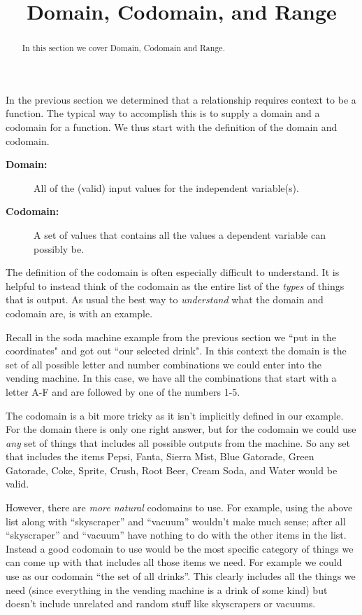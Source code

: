 \documentclass{ximera}
\title{Domain, Codomain, and Range}
\begin{document}
\begin{abstract}
    In this section we cover Domain, Codomain and Range.
\end{abstract}
\maketitle
In the previous section we determined that a relationship requires context to be a function. The typical way to accomplish this is to supply a domain and a codomain for a function. We thus start with the definition of the domain and codomain.

\begin{description}
    \item[\textbf{Domain:}] All of the (valid) input values for the independent variable(s).
    \item[\textbf{Codomain:}] A set of values that contains all the values a dependent variable can possibly be.
\end{description}

The definition of the codomain is often especially difficult to understand. It is helpful to instead think of the codomain as the entire list of the \textit{types} of things that is output. As usual the best way to \textit{understand} what the domain and codomain are, is with an example.

Recall in the soda machine example from the previous section we ``put in the coordinates" and got out ``our selected drink". In this context the domain is the set of all possible letter and number combinations we could enter into the vending machine. In this case, we have all the combinations that start with a letter A-F and are followed by one of the numbers 1-5.

The codomain is a bit more tricky as it isn't implicitly defined in our example. For the domain there is only one right answer, but for the codomain we could use \textit{any} set of things that includes all possible outputs from the machine. So any set that includes the items Pepsi, Fanta, Sierra Mist, Blue Gatorade, Green Gatorade, Coke, Sprite, Crush, Root Beer, Cream Soda, and Water would be valid.

However, there are \textit{more natural} codomains to use. For example, using the above list along with ``skyscraper'' and ``vacuum'' wouldn't make much sense; after all ``skyscraper'' and ``vacuum'' have nothing to do with the other items in the list. Instead a good codomain to use would be the most specific category of things we can come up with that includes all those items we need. For example we could use as our codomain ``the set of all drinks''. This clearly includes all the things we need (since everything in the vending machine is a drink of some kind) but doesn't include unrelated and random stuff like skyscrapers or vacuums.
\end{document}
